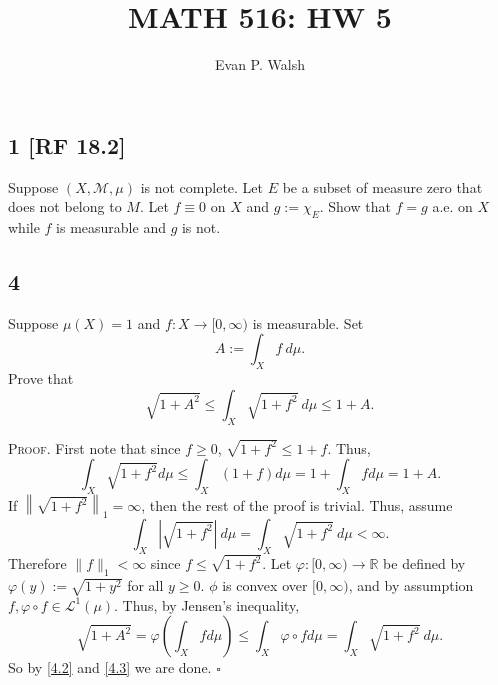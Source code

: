 \documentclass[12pt]{article}
\title{MATH 516: HW 5}
\author{Evan P. Walsh}
\newcounter{ProofCounter}
\newenvironment{Proof}{\stepcounter{ProofCounter}\textsc{Proof.}}{\hfill$\square$}
\begin{document}
\maketitle


\subsection*{1 [RF 18.2]}
\begin{tcolorbox}
Suppose $(X,\mathcal{M}, \mu)$ is not complete. Let $E$ be a subset of measure zero that does not belong to $M$. Let $f \equiv 0$ on $X$ and $g :=
\chi_{E}$. Show that $f = g$ a.e. on $X$ while $f$ is measurable and $g$ is not.
\end{tcolorbox}


\newpage
\subsection*{4}
\begin{tcolorbox}
Suppose $\mu(X) = 1$ and $f : X \rightarrow [0,\infty)$ is measurable. Set 
\[ A := \int_{X}f\ d\mu. \]
Prove that 
\[ \sqrt{1 + A^{2}} \leq \int_{X}\sqrt{1  +f^{2}}\ d\mu \leq 1 + A. \]
\end{tcolorbox}
\begin{Proof}
First note that since $f \geq 0$, $\sqrt{1 + f^{2}} \leq 1 + f$. Thus,
\begin{equation}
\int_{X}\sqrt{1 + f^{2}}d\mu \leq \int_{X}(1 + f)d\mu = 1 + \int_{X}fd\mu = 1 + A.
\label{4.2}
\end{equation}
If $\left\|\sqrt{1 + f^{2}}\right\|_{1} = \infty$, then the rest of the proof is trivial. Thus, assume 
\[ \int_{X}\left|\sqrt{1 + f^{2}}\right|\ d\mu = \int_{X}\sqrt{1 + f^{2}}\ d\mu  < \infty.\] 
Therefore $\|f\|_{1} < \infty$ since $f \leq \sqrt{1 + f^{2}}$.
Let $\varphi : [0,\infty) \rightarrow \mathbb{R}$ be defined by $\varphi(y) := \sqrt{1 + y^{2}}$ for all $y \geq 0$. $\phi$ is convex over $[0,\infty)$,
and by assumption $f, \varphi\circ f \in \mathcal{L}^{1}(\mu)$. Thus, by Jensen's inequality,
\begin{equation}
\sqrt{1 + A^{2}} = \varphi\left( \int_{X}fd\mu \right) \leq \int_{X}\varphi\circ f d\mu = \int_{X}\sqrt{1 + f^{2}}\ d\mu.
\label{4.3}
\end{equation}
So by \eqref{4.2} and \eqref{4.3} we are done.
\end{Proof}



\newpage
\end{document}

